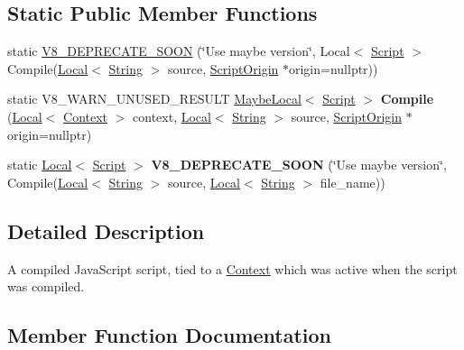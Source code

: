 \subsection*{Static Public Member Functions}
\begin{DoxyCompactItemize}
\item 
static \hyperlink{classv8_1_1Script_abd2f43c38e8bc6bcc789e6763e0c8e95}{V8\+\_\+\+D\+E\+P\+R\+E\+C\+A\+T\+E\+\_\+\+S\+O\+O\+N} (\char`\"{}Use maybe version\char`\"{}, Local$<$ \hyperlink{classv8_1_1Script}{Script} $>$ Compile(\hyperlink{classv8_1_1Local}{Local}$<$ \hyperlink{classv8_1_1String}{String} $>$ source, \hyperlink{classv8_1_1ScriptOrigin}{Script\+Origin} $\ast$origin=nullptr))
\item 
\hypertarget{classv8_1_1Script_a1793e3022a87f5a574df10bff8b42762}{}static V8\+\_\+\+W\+A\+R\+N\+\_\+\+U\+N\+U\+S\+E\+D\+\_\+\+R\+E\+S\+U\+L\+T \hyperlink{classv8_1_1MaybeLocal}{Maybe\+Local}$<$ \hyperlink{classv8_1_1Script}{Script} $>$ {\bfseries Compile} (\hyperlink{classv8_1_1Local}{Local}$<$ \hyperlink{classv8_1_1Context}{Context} $>$ context, \hyperlink{classv8_1_1Local}{Local}$<$ \hyperlink{classv8_1_1String}{String} $>$ source, \hyperlink{classv8_1_1ScriptOrigin}{Script\+Origin} $\ast$origin=nullptr)\label{classv8_1_1Script_a1793e3022a87f5a574df10bff8b42762}

\item 
\hypertarget{classv8_1_1Script_a10908ea8e3a2b5f5dc816b19c4fc59e5}{}static \hyperlink{classv8_1_1Local}{Local}$<$ \hyperlink{classv8_1_1Script}{Script} $>$ {\bfseries V8\+\_\+\+D\+E\+P\+R\+E\+C\+A\+T\+E\+\_\+\+S\+O\+O\+N} (\char`\"{}Use maybe version\char`\"{}, Compile(\hyperlink{classv8_1_1Local}{Local}$<$ \hyperlink{classv8_1_1String}{String} $>$ source, \hyperlink{classv8_1_1Local}{Local}$<$ \hyperlink{classv8_1_1String}{String} $>$ file\+\_\+name))\label{classv8_1_1Script_a10908ea8e3a2b5f5dc816b19c4fc59e5}

\end{DoxyCompactItemize}


\subsection{Detailed Description}
A compiled Java\+Script script, tied to a \hyperlink{classv8_1_1Context}{Context} which was active when the script was compiled. 

\subsection{Member Function Documentation}
\hypertarget{classv8_1_1Script_afac25cad452a61897c375c2b881e2070}{}
